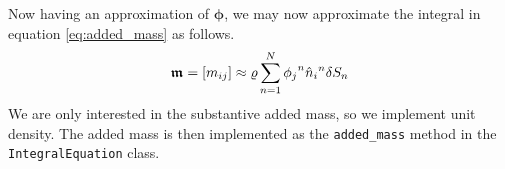 Now having an approximation of $\bm{\phi}$, we may now approximate the integral in equation \eqref{eq:added_mass} as follows.
\[
    \bm{\mathfrak{m}} = [m_{ij}] \approx \varrho \sum_{n = 1}^{N} {\phi_{j}}^{n} {\hat{n}}_{i}{}^{n} \delta S_{n}
\]
We are only interested in the substantive added mass, so we implement unit density.
The added mass is then implemented as the \texttt{added\_mass} method in the \texttt{IntegralEquation} class.
